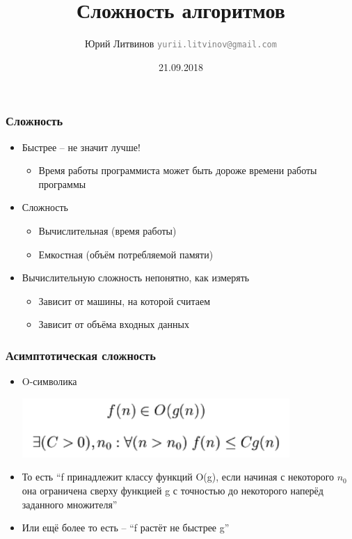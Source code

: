 \documentclass[xetex,mathserif,serif]{beamer}
\title{Сложность алгоритмов}
\author[Юрий Литвинов]{Юрий Литвинов \newline \textcolor{gray}{\small\texttt{yurii.litvinov@gmail.com}}}
\date{21.09.2018}
\begin{document}
	
	\frame{\titlepage}
	
	\begin{frame}
		\frametitle{Сложность}
		\begin{itemize}
			\item Быстрее – не значит лучше!
			\begin{itemize}
				\item Время работы программиста может быть дороже времени работы программы
			\end{itemize}                                                     
			\item Сложность
			\begin{itemize}
				\item Вычислительная (время работы)
				\item Емкостная (объём потребляемой памяти)
			\end{itemize}
			\item Вычислительную сложность непонятно, как измерять
			\begin{itemize}
				\item Зависит от машины, на которой считаем
				\item Зависит от объёма входных данных
			\end{itemize}
		\end{itemize}
	\end{frame}

	\begin{frame}
		\frametitle{Асимптотическая сложность}
		\begin{itemize}
			\item O-символика
			\begin{center}
				\includegraphics[width=0.8\textwidth]{complexity-o-notation.png}
			\end{center}
			\item То есть “f принадлежит классу функций O(g), если начиная с некоторого $n_0$ она ограничена сверху функцией g с точностью до некоторого наперёд заданного множителя”
			\item Или ещё более то есть – “f растёт не быстрее g”
		\end{itemize}
	\end{frame}
\end{document}
